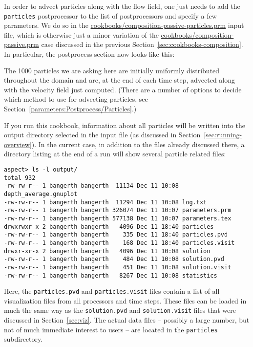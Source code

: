 \documentclass{article}
\begin{document}
In order to advect particles along with the flow field, one just needs to
add the \texttt{particles} postprocessor to the list of postprocessors and specify
a few parameters. We do so in the
\url{cookbooks/composition-passive-particles.prm} input file, which is otherwise
just a minor variation of the \url{cookbooks/composition-passive.prm} case
discussed in the previous Section~\ref{sec:cookbooks-composition}. In
particular, the postprocess section now looks like this:




The 1000 particles we are asking here are initially uniformly distributed
throughout the domain and are, at the end of each time step, advected along with
the velocity field just computed. (There are a number of options to decide which
method to use for advecting particles, see
Section~\ref{parameters:Postprocess/Particles}.) 

If you run this cookbook, information about all particles will be written into
the output directory selected in the input file (as discussed in
Section~\ref{sec:running-overview}). In the current case, in addition to the
files already discussed there, a directory listing at the end of a run will show
several particle related files:
\begin{lstlisting}[frame=single,language=ksh]
aspect> ls -l output/
total 932
-rw-rw-r-- 1 bangerth bangerth  11134 Dec 11 10:08 depth_average.gnuplot
-rw-rw-r-- 1 bangerth bangerth  11294 Dec 11 10:08 log.txt
-rw-rw-r-- 1 bangerth bangerth 326074 Dec 11 10:07 parameters.prm
-rw-rw-r-- 1 bangerth bangerth 577138 Dec 11 10:07 parameters.tex
drwxrwxr-x 2 bangerth bangerth   4096 Dec 11 18:40 particles
-rw-rw-r-- 1 bangerth bangerth    335 Dec 11 18:40 particles.pvd
-rw-rw-r-- 1 bangerth bangerth    168 Dec 11 18:40 particles.visit
drwxr-xr-x 2 bangerth bangerth   4096 Dec 11 10:08 solution
-rw-rw-r-- 1 bangerth bangerth    484 Dec 11 10:08 solution.pvd
-rw-rw-r-- 1 bangerth bangerth    451 Dec 11 10:08 solution.visit
-rw-rw-r-- 1 bangerth bangerth   8267 Dec 11 10:08 statistics
\end{lstlisting}
Here, the \texttt{particles.pvd} and \texttt{particles.visit} files contain
a list of all visualization files from all processors and time steps. These
files can be loaded in much the same way as the \texttt{solution.pvd} and
\texttt{solution.visit} files that were discussed in Section~\ref{sec:viz}. The
actual data files -- possibly a large number, but not of much immediate interest
to users -- are located in the \texttt{particles} subdirectory.
\end{document}
